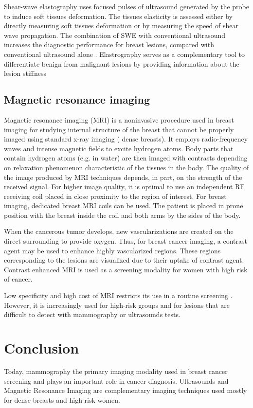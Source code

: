 Shear-wave elastography uses focused pulses of ultrasound generated by the probe to induce soft tissues deformation. The tissues elasticity is assessed either by directly measuring soft tissues deformation or by measuring the speed of shear wave propagation. The combination of SWE with conventional ultrasound
increases the diagnostic performance for breast lesions, compared
with conventional ultrasound alone \citep{youk_shear_2017}.  Elastrography serves as a complementary tool to differentiate benign from malignant lesions by providing information about the lesion stiffness\citep{itoh_breast_2006,olgun_use_2014}
 
\subsection{Magnetic resonance imaging}\label{subsection:mri}

Magnetic resonance imaging (MRI) is a noninvasive procedure used in breast imaging for studying internal structure of the breast that cannot be properly imaged using standard x-ray imaging ( dense breasts).  It employs radio-frequency waves and intense magnetic fields to excite hydrogen atoms. Body parts that contain hydrogen atoms (e.g. in water) are then imaged with contrasts depending on relaxation phenomenon characteristic of the tissues in the body. The quality of the image produced by MRI techniques depends, in part, on the strength of the received signal. For higher image quality, it is optimal to use an independent RF receiving coil placed in close proximity to the region of interest.  For breast imaging, dedicated breast MRI coils can be used. The patient is placed in prone position with the breast inside the coil and both arms by the sides of the body.

When the cancerous tumor develops, new vascularizations are created on the direct surrounding to provide oxygen.
Thus, for breast cancer imaging, a contrast agent may be used to enhance highly vascularized regions. These regions corresponding to the lesions are visualized due to their uptake of contrast agent. Contrast enhanced MRI is used as a screening modality for women with high risk of cancer.  

Low specificity and high cost of MRI restricts its use in a routine screening \citep{peters_meta_2008}. However, it is increasingly used for high-risk groups and for lesions that are difficult to detect with mammography or ultrasounds tests. 


\section{Conclusion}\label{section:conlusion}
Today, mammography the primary imaging modality used in breast cancer screening and plays an important role in cancer diagnosis. Ultrasounds and Magnetic Resonance Imaging are complementary imaging techniques used mostly for dense breasts and high-risk women.
 
